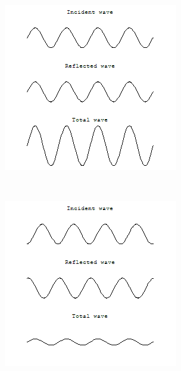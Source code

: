 \documentclass[12pt,a4paper,titlepage,final]{report}
\begin{document}
\begin{figure}[!h]
        \centering
        \begin{subfigure}[b]{0.23\textwidth}
                \includegraphics[width=\textwidth]{sin-1}
                \caption{}
                \label{fig:standing_wave:frame_1}
        \end{subfigure}%
        ~ %
        \begin{subfigure}[b]{0.23\textwidth}
                \includegraphics[width=\textwidth]{sin-2}

\end{subfigure}
\end{figure}
\end{document}
